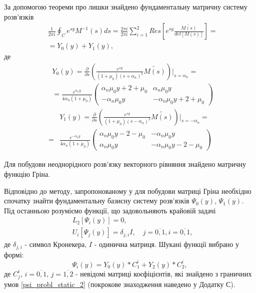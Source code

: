 За допомогою теореми про лишки знайдено фундаментальну матричну систему розв'язків
\begin{align*}
    &\frac{1}{2\pi i} \oint_C e^{sy} M^{-1}(s)ds = \frac{2 \pi i}{2 \pi i} \sum_{i=1}^{2} Res\left[ e^{sy} \frac{\widetilde{M(s)}}{det[M(s)]} \right] = \\
    & =Y_0(y) + Y_1(y),
\end{align*}
де
\begin{align}
    &Y_0(y) =  \frac{\partial}{\partial s} \left( \frac{e^{sy}}{(1 + \mu_0)(s+\alpha_n)^2} \widetilde{M(s)} \right) \Big|_{s=\alpha_n} = \nonumber \\
    &=\frac{e^{\alpha_n y}}{4\alpha_n(1 + \mu_0)} \begin{pmatrix}
    \alpha_n \mu_0 y + 2 + \mu_0 & \alpha_n \mu_0 y \\
    -\alpha_n \mu_0 y & -\alpha_n \mu_0 y + 2 + \mu_0
    \end{pmatrix}
\end{align}
\begin{align}
    &Y_1(y) = \frac{\partial}{\partial s} \left(\frac{e^{sy}}{(1 + \mu_0)(s-\alpha_n)^2} \widetilde{M(s)} \right) \Big|_{s=-\alpha_n} = \nonumber \\
    =&\frac{e^{-\alpha_n y}}{4\alpha_n(1 + \mu_0)} \begin{pmatrix}
    \alpha_n \mu_0 y - 2 - \mu_0 & -\alpha_n \mu_0 y \\
    \alpha_n \mu_0 y & -\alpha_n \mu_0 y - 2 - \mu_0
    \end{pmatrix}
\end{align}

Для побудови неоднорідного розв'язку векторного рівняння знайдено матричну функцію Гріна.

Відповідно до методу, запропонованому у \cite{popov_2} для побудови матриці Гріна необхідно спочатку знайти фундаментальну базисну систему розв'язків $\Psi_0(y)$, $\Psi_1(y)$.
Під останньою розуміємо функції, що задовольняють крайовій задачі
\begin{align}\label{psi_probl_static_2}
    &L_2\left[ \Psi_i(y) \right] = 0, \nonumber \\
    &U_i\left[ \Psi_j(y) \right] = \delta_{j,i}I, \quad j= \overline{0, 1}, i= \overline{0, 1},
\end{align}
де $\delta_{j,i}$ - символ Кронекера, $I$ - одинична матриця.
Шукані функції вибрано у формі:
\begin{equation}\label{psi_static_2}
    \Psi_i(y) = Y_0(y) * C_1^i + Y_2(y) * C_2^i,
\end{equation}
де $C_j^i$, $i=\overline{0, 1}$, $j=\overline{1, 2}$ - невідомі матриці коєфіцієнтів, які знайдено з граничних умов \eqref{psi_probl_static_2}
(покрокове знаходження наведено у Додатку С).

